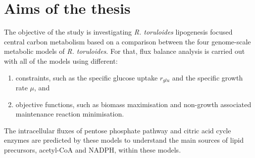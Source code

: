 \chapter{Aims of the thesis}

The objective of the study is investigating \textit{R. toruloides} lipogenesis
focused central carbon metabolism based on a comparison between the four genome-scale metabolic models of \textit{R. toruloides}.
For that, flux balance analysis is carried out with all of the models using different:
\begin{enumerate}[noitemsep, label=(\roman*)]
    \item constraints, such as the specific glucose uptake $r_{glu}$ and the specific growth rate $\mu$, and
    \item objective functions, such as biomass maximisation and non-growth associated maintenance reaction minimisation.
\end{enumerate}
The intracellular fluxes of pentose phosphate pathway and citric acid cycle enzymes are predicted by these models to understand the main sources of lipid precursors, acetyl-CoA and NADPH, within these models. 
